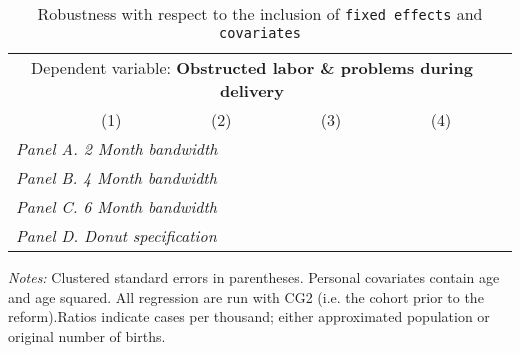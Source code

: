  \begin{table}[H] \begin{threeparttable} \centering \caption{Robustness with respect to the inclusion of \texttt{fixed effects} and \texttt{covariates}} {\def\sym#1{\ifmmode^{#1}\else\(^{#1}\)\fi} \begin{tabular}{l*{5}{c}} \toprule \multicolumn{5}{c}{Dependent variable: \textbf{Obstructed labor \& problems during delivery}} \\ \cmidrule(lr){2-5}
            &\multicolumn{1}{c}{(1)}&\multicolumn{1}{c}{(2)}&\multicolumn{1}{c}{(3)}&\multicolumn{1}{c}{(4)}\\
\midrule
 \multicolumn{5}{l}{\emph{Panel A. 2 Month bandwidth}} \\    \midrule\multicolumn{5}{l}{\emph{Panel B. 4 Month bandwidth}} \\    \midrule\multicolumn{5}{l}{\emph{Panel C. 6 Month bandwidth}} \\    \midrule\multicolumn{5}{l}{\emph{Panel D. Donut specification}} \\    \midrule  
\bottomrule \end{tabular} } \begin{tablenotes} \item \scriptsize \emph{Notes:} Clustered standard errors in parentheses. Personal covariates contain age and age squared. All regression are run with CG2 (i.e. the cohort prior to the reform).Ratios indicate cases per thousand; either approximated population or original number of births. \end{tablenotes} \end{threeparttable} \end{table} 
